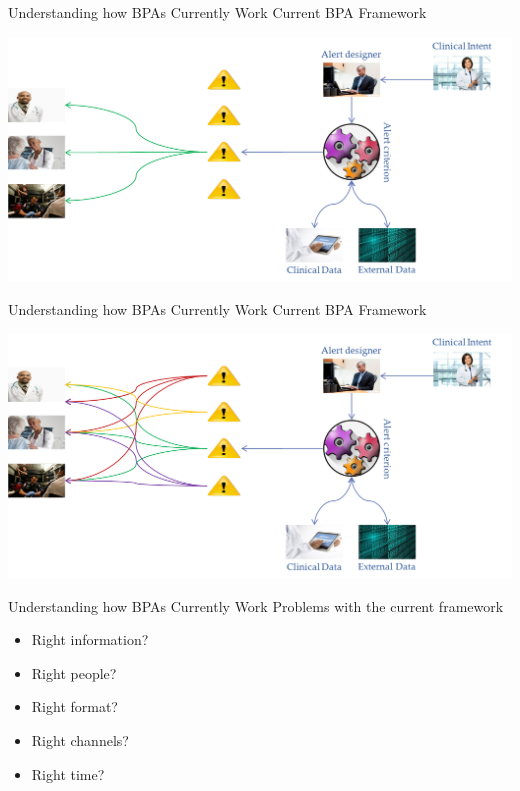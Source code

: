\documentclass[10pt]{beamer}
\begin{document}
\begin{frame}{Understanding how BPAs Currently Work}
Current BPA Framework
	\begin{center}
		\includegraphics[width=1.2\textwidth, center, trim=-1cm -1cm -1cm -1cm]{images/current_framework.png}
	\end{center}
\end{frame}

\begin{frame}{Understanding how BPAs Currently Work}
Current BPA Framework
	\begin{center}
		\includegraphics[width=1.2\textwidth, center, trim=-1cm -1cm -1cm -1cm]{images/current_framework_2.png}
	\end{center}
\end{frame}

\begin{frame}{Understanding how BPAs Currently Work}
Problems with the current framework
\pause
\begin{itemize}
	\item Right information?
	\pause
	\item Right people?
	\pause
	\item Right format?
	\pause
	\item Right channels?
	\pause
	\item Right time?
\end{itemize}
\end{frame}
\end{document}
